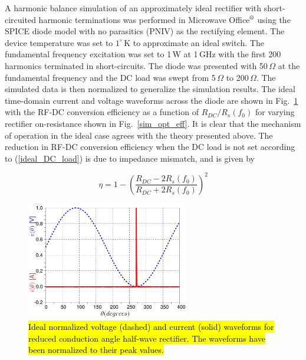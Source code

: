 \documentclass[journal]{IEEEtran}
\begin{document}
A harmonic balance simulation of an approximately ideal rectifier with short-circuited harmonic terminations was performed in Microwave Office$\textsuperscript{\textregistered}$ using the SPICE diode model with no parasitics (PNIV) as the rectifying element.  The device temperature was set to $1^\circ$\,K to approximate an ideal switch.  The fundamental frequency excitation was set to 1\,W at 1\,GHz with the first 200 harmonics terminated in short-circuits.  The diode was presented with 50\,$\Omega$ at the fundamental frequency and the DC load was swept from 5\,$\Omega$ to 200\,$\Omega$.  The simulated data is then normalized to generalize the simulation results. The ideal time-domain current and voltage waveforms across the diode are shown in Fig.~\ref{waveforms} with the RF-DC conversion efficiency as a function of $R_{DC} / R_s(f_0)$ for varying rectifier on-resistance shown in Fig.~\ref{sim_opt_eff}.  It is clear that the mechanism of operation in the ideal case agrees with the theory presented above.  The reduction in RF-DC conversion efficiency when the DC load is not set according to (\ref{ideal_DC_load}) is due to impedance mismatch, and is given by


\begin{equation}\label{eff_dc_load}
\eta = 1 - \left(\frac{R_{DC} - 2R_s(f_0)}{R_{DC} + 2R_s(f_0)}\right)^2
\end{equation}

\begin{figure}
  \begin{center}
  \includegraphics[width=2.8in]{pdf/02.pdf}
  \caption{\hl{Ideal normalized voltage (dashed) and current (solid) waveforms for reduced conduction angle half-wave rectifier. The waveforms have been normalized to their peak values.}}\label{waveforms}
  \end{center}
\end{figure}
\end{document}
